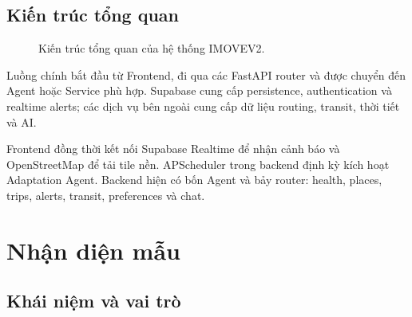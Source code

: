 \documentclass[12pt,a4paper]{article}
\begin{document}
\subsection{Kiến trúc tổng quan}


\begin{figure}[H]
\centering
{}
\caption{Kiến trúc tổng quan của hệ thống IMOVEV2.}
\label{fig:architecture}
\end{figure}

Luồng chính bắt đầu từ Frontend, đi qua các FastAPI router và được chuyển đến Agent hoặc Service phù hợp. Supabase cung cấp persistence, authentication và realtime alerts; các dịch vụ bên ngoài cung cấp dữ liệu routing, transit, thời tiết và AI.

Frontend đồng thời kết nối Supabase Realtime để nhận cảnh báo và OpenStreetMap để tải tile nền. APScheduler trong backend định kỳ kích hoạt Adaptation Agent. Backend hiện có bốn Agent và bảy router: health, places, trips, alerts, transit, preferences và chat.

\section{Nhận diện mẫu}

\subsection{Khái niệm và vai trò}
\end{document}
